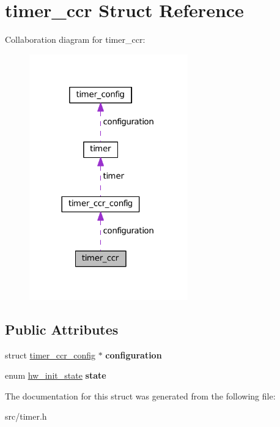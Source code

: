 \hypertarget{structtimer__ccr}{}\section{timer\+\_\+ccr Struct Reference}
\label{structtimer__ccr}


Collaboration diagram for timer\+\_\+ccr\+:\nopagebreak
\begin{figure}[H]
\begin{center}
\leavevmode
\includegraphics[width=194pt]{structtimer__ccr__coll__graph}
\end{center}
\end{figure}
\subsection*{Public Attributes}
\begin{DoxyCompactItemize}
\item 
\hypertarget{structtimer__ccr_ae53385b34f3535fa8cc732edc5fccc28}{}struct \hyperlink{structtimer__ccr__config}{timer\+\_\+ccr\+\_\+config} $\ast$ {\bfseries configuration}\label{structtimer__ccr_ae53385b34f3535fa8cc732edc5fccc28}

\item 
\hypertarget{structtimer__ccr_addba2954b9a68f87a1e716a65095c6a9}{}enum \hyperlink{hw_8h_a3c02952100e7d051b77cdf060ca0ba9b}{hw\+\_\+init\+\_\+state} {\bfseries state}\label{structtimer__ccr_addba2954b9a68f87a1e716a65095c6a9}

\end{DoxyCompactItemize}


The documentation for this struct was generated from the following file\+:\begin{DoxyCompactItemize}
\item 
src/timer.\+h\end{DoxyCompactItemize}
